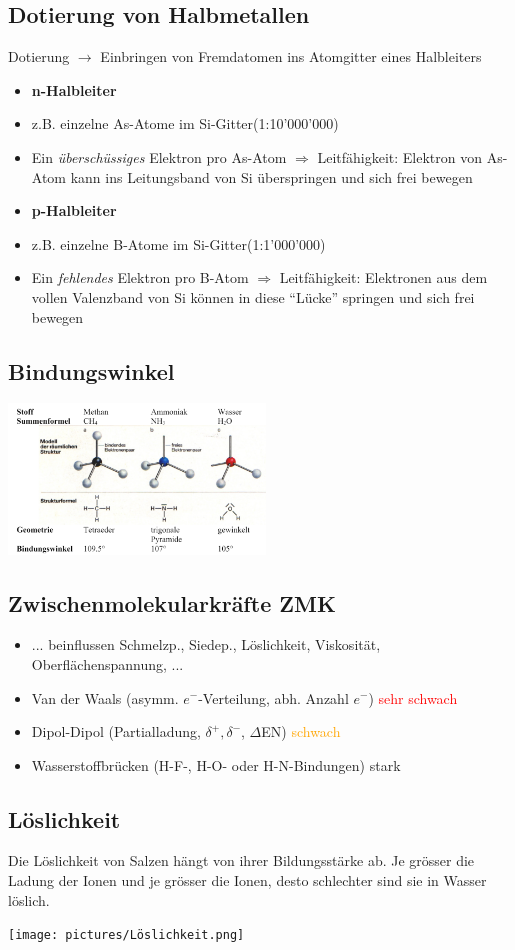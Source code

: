 \subsection{Dotierung von Halbmetallen}
    Dotierung $\rightarrow$ Einbringen von Fremdatomen ins Atomgitter eines Halbleiters
    \begin{itemize}
        \item \textbf{n-Halbleiter}
        \item[] z.B. einzelne As-Atome im Si-Gitter(1:10'000'000)
        \item[] Ein \textit{überschüssiges} Elektron pro As-Atom $\Rightarrow$ Leitfähigkeit: Elektron von As-Atom kann ins Leitungsband von Si überspringen und sich frei bewegen
        \item \textbf{p-Halbleiter}
        \item[] z.B. einzelne B-Atome im Si-Gitter(1:1'000'000)
        \item[] Ein \textit{fehlendes} Elektron pro B-Atom $\Rightarrow$ Leitfähigkeit: Elektronen aus dem vollen Valenzband von Si können in diese ``Lücke'' springen und sich frei bewegen
    \end{itemize}
\subsection{Bindungswinkel}
    \begin{center}
    \includegraphics[height=4cm]{pictures/Winkel.png}
    \end{center}

\subsection{Zwischenmolekularkräfte ZMK}
    \begin{itemize}
        \item ... beinflussen Schmelzp., Siedep., Löslichkeit, Viskosität, Oberflächenspannung, ...
        \item Van der Waals (asymm. $e^-$-Verteilung, abh. Anzahl $e^-$) \textcolor{red}{sehr schwach}
        \item Dipol-Dipol (Partialladung, $\delta^+, \delta^-$, $\Delta$EN) \textcolor{orange}{schwach}
        \item Wasserstoffbrücken (H-F-, H-O- oder H-N-Bindungen) \textcolor{green!80!black}{stark}
    \end{itemize}

\subsection{Löslichkeit}
    Die Löslichkeit von Salzen hängt von ihrer Bildungsstärke ab. Je grösser die Ladung der Ionen und je grösser die Ionen, desto schlechter sind sie in Wasser löslich.
    \begin{center}
    \texttt{[image: pictures/Löslichkeit.png]}
    \end{center}